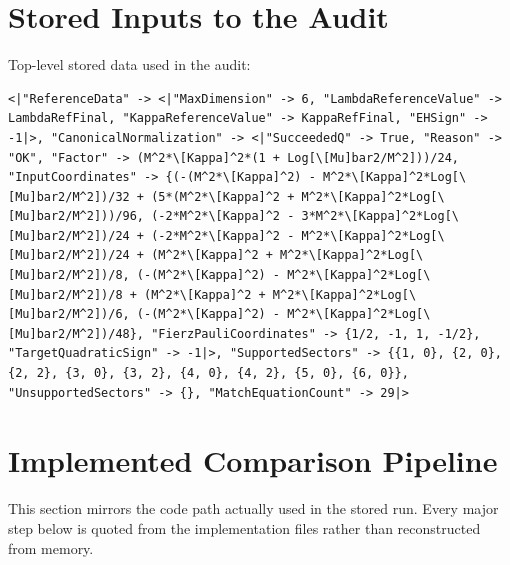 \documentclass[11pt]{article}
\begin{document}
\section{Stored Inputs to the Audit}

Top-level stored data used in the audit:

\begin{verbatim}
<|"ReferenceData" -> <|"MaxDimension" -> 6, "LambdaReferenceValue" -> LambdaRefFinal, "KappaReferenceValue" -> KappaRefFinal, "EHSign" -> -1|>, "CanonicalNormalization" -> <|"SucceededQ" -> True, "Reason" -> "OK", "Factor" -> (M^2*\[Kappa]^2*(1 + Log[\[Mu]bar2/M^2]))/24, "InputCoordinates" -> {(-(M^2*\[Kappa]^2) - M^2*\[Kappa]^2*Log[\[Mu]bar2/M^2])/32 + (5*(M^2*\[Kappa]^2 + M^2*\[Kappa]^2*Log[\[Mu]bar2/M^2]))/96, (-2*M^2*\[Kappa]^2 - 3*M^2*\[Kappa]^2*Log[\[Mu]bar2/M^2])/24 + (-2*M^2*\[Kappa]^2 - M^2*\[Kappa]^2*Log[\[Mu]bar2/M^2])/24 + (M^2*\[Kappa]^2 + M^2*\[Kappa]^2*Log[\[Mu]bar2/M^2])/8, (-(M^2*\[Kappa]^2) - M^2*\[Kappa]^2*Log[\[Mu]bar2/M^2])/8 + (M^2*\[Kappa]^2 + M^2*\[Kappa]^2*Log[\[Mu]bar2/M^2])/6, (-(M^2*\[Kappa]^2) - M^2*\[Kappa]^2*Log[\[Mu]bar2/M^2])/48}, "FierzPauliCoordinates" -> {1/2, -1, 1, -1/2}, "TargetQuadraticSign" -> -1|>, "SupportedSectors" -> {{1, 0}, {2, 0}, {2, 2}, {3, 0}, {3, 2}, {4, 0}, {4, 2}, {5, 0}, {6, 0}}, "UnsupportedSectors" -> {}, "MatchEquationCount" -> 29|>
\end{verbatim}

\section{Implemented Comparison Pipeline}
This section mirrors the code path actually used in the stored run. Every major step below is quoted from the implementation files rather than reconstructed from memory.
\end{document}
